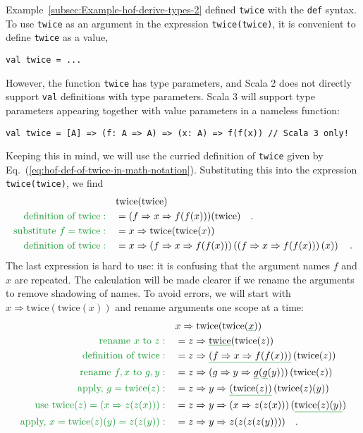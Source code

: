 Example~\ref{subsec:Example-hof-derive-types-2} defined \lstinline!twice!
with the \lstinline!def! syntax. To use \lstinline!twice! as an
argument in the expression \lstinline!twice(twice)!, it is convenient
to define \lstinline!twice! as a value,
\begin{lstlisting}
val twice = ...
\end{lstlisting}
However, the function \lstinline!twice! has type parameters, and
Scala 2 does not directly support \lstinline!val! definitions with
type parameters. Scala 3 will support type parameters appearing together
with value parameters in a nameless function:
\begin{lstlisting}
val twice = [A] => (f: A => A) => (x: A) => f(f(x)) // Scala 3 only!
\end{lstlisting}
Keeping this in mind, we will use the curried definition of \lstinline!twice!
given by Eq.~(\ref{eq:hof-def-of-twice-in-math-notation}). Substituting
this into the expression \lstinline!twice(twice)!, we find
\begin{align*}
 & \text{twice}(\text{twice})\\
{\color{greenunder}\text{definition of twice}:}\quad & =(f\Rightarrow x\Rightarrow f(f(x)))(\text{twice})\quad.\\
{\color{greenunder}\text{substitute }f=\text{twice}:}\quad & =x\Rightarrow\text{twice}(\text{twice}(x))\\
{\color{greenunder}\text{definition of twice}:}\quad & =x\Rightarrow\left(f\Rightarrow x\Rightarrow f(f(x))\right)\left(\left(f\Rightarrow x\Rightarrow f(f(x))\right)(x)\right)\quad.
\end{align*}
The last expression is hard to use: it is confusing that the argument
names $f$ and $x$ are repeated. The calculation will be made clearer
if we rename the arguments to remove shadowing of names.
To avoid errors, we will start with $x\Rightarrow\text{twice}(\text{twice}(x))$
and rename arguments one scope at a time:
\begin{align*}
 & x\Rightarrow\text{twice}(\text{twice}(\gunderline x))\\
{\color{greenunder}\text{rename }x\text{ to }z:}\quad & =z\Rightarrow\gunderline{\text{twice}}(\text{twice}(z))\\
{\color{greenunder}\text{definition of twice}:}\quad & =z\Rightarrow\gunderline{\left(f\Rightarrow x\Rightarrow f(f(x))\right)}\left(\text{twice}(z)\right)\\
{\color{greenunder}\text{rename }f,x\text{ to }g,y:}\quad & =z\Rightarrow(g\Rightarrow y\Rightarrow\gunderline g(\gunderline g(y)))\left(\text{twice}(z)\right)\\
{\color{greenunder}\text{apply, }g=\text{twice}(z):}\quad & =z\Rightarrow y\Rightarrow\gunderline{\left(\text{twice}(z)\right)}\left(\text{twice}(z)(y)\right)\\
{\color{greenunder}\text{use }\text{twice}(z)=\left(x\Rightarrow z(z(x))\right):}\quad & =z\Rightarrow y\Rightarrow\left(x\Rightarrow z(z(x))\right)(\gunderline{\text{twice}(z)(y)})\\
{\color{greenunder}\text{apply, }x=\text{twice}(z)(y)=z(z(y)):}\quad & =z\Rightarrow y\Rightarrow z(z(z(z(y))))\quad.
\end{align*}
